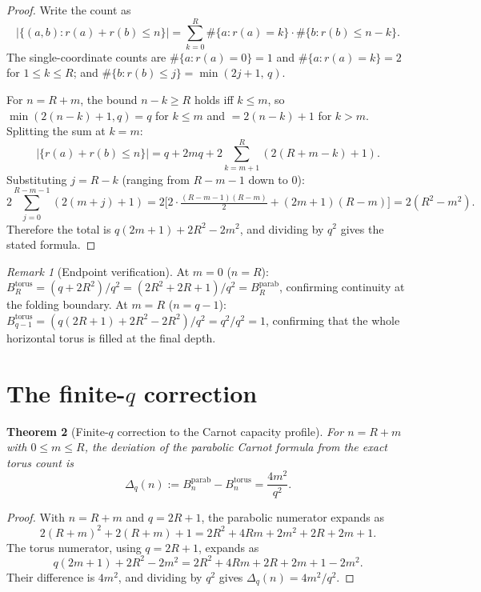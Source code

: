 \documentclass[12pt,a4paper]{article}
\newtheorem{theorem}{Theorem}[section]
\theoremstyle{remark}
\newtheorem{remark}[theorem]{Remark}
\begin{document}
    \begin{proof}
      Write the count as
      \[
        \bigl|\bigl\{(a,b) : r(a)+r(b) \leq n\bigr\}\bigr|
        = \sum_{k=0}^{R} \#\{a : r(a)=k\} \cdot \#\{b : r(b) \leq n-k\}.
      \]
      The single-coordinate counts are $\#\{a : r(a) = 0\} = 1$ and $\#\{a : r(a) = k\} = 2$
      for $1 \leq k \leq R$; and $\#\{b : r(b) \leq j\} = \min(2j+1,\, q)$.

      For $n = R+m$, the bound $n-k \geq R$ holds iff $k \leq m$, so
      $\min(2(n-k)+1, q) = q$ for $k \leq m$ and $= 2(n-k)+1$ for $k > m$.
      Splitting the sum at $k = m$:
      \[
        \bigl|\{r(a)+r(b)\leq n\}\bigr|
        = q + 2mq + 2\sum_{k=m+1}^{R}(2(R+m-k)+1).
      \]
      Substituting $j = R - k$ (ranging from $R-m-1$ down to $0$):
      \[
        2\sum_{j=0}^{R-m-1}\!(2(m+j)+1)
        = 2\bigl[2\cdot\tfrac{(R-m-1)(R-m)}{2} + (2m+1)(R-m)\bigr]
        = 2(R^2-m^2).
      \]
      Therefore the total is $q(2m+1) + 2R^2 - 2m^2$, and dividing by $q^2$ gives the
      stated formula.
    \end{proof}

    \begin{remark}[Endpoint verification]
      \label{rem:endpoints}
      At $m = 0$ ($n = R$): $B_R^{\mathrm{torus}} = (q + 2R^2)/q^2 = (2R^2+2R+1)/q^2 =
      B_R^{\mathrm{parab}}$, confirming continuity at the folding boundary.
      At $m = R$ ($n = q-1$): $B_{q-1}^{\mathrm{torus}} = (q(2R+1)+2R^2-2R^2)/q^2 =
      q^2/q^2 = 1$, confirming that the whole horizontal torus is filled at the final depth.
    \end{remark}

  \section{The finite-$q$ correction}
    \label{sec:correction}

    \begin{theorem}[Finite-$q$ correction to the Carnot capacity profile]
      \label{thm:correction}
      For $n = R+m$ with $0 \leq m \leq R$, the deviation of the parabolic Carnot formula
      from the exact torus count is
      \[
        \Delta_q(n) := B_n^{\mathrm{parab}} - B_n^{\mathrm{torus}} = \frac{4m^2}{q^2}.
      \]
    \end{theorem}

    \begin{proof}
      With $n = R+m$ and $q = 2R+1$, the parabolic numerator expands as
      \[
        2(R+m)^2+2(R+m)+1 = 2R^2+4Rm+2m^2+2R+2m+1.
      \]
      The torus numerator, using $q = 2R+1$, expands as
      \[
        q(2m+1)+2R^2-2m^2
        = 2R^2+4Rm+2R+2m+1-2m^2.
      \]
      Their difference is $4m^2$, and dividing by $q^2$ gives $\Delta_q(n) = 4m^2/q^2$.
    \end{proof}
\end{document}
